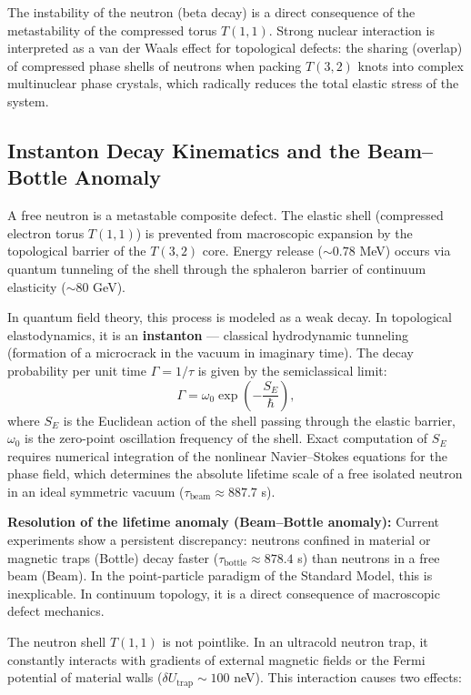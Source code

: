 \documentclass[11pt,a4paper]{article}
\begin{document}
The instability of the neutron (beta decay) is a direct consequence of the metastability of the compressed torus $T(1,1)$. Strong nuclear interaction is interpreted as a van der Waals effect for topological defects: the sharing (overlap) of compressed phase shells of neutrons when packing $T(3,2)$ knots into complex multinuclear phase crystals, which radically reduces the total elastic stress of the system.

\subsection{Instanton Decay Kinematics and the Beam–Bottle Anomaly}
A free neutron is a metastable composite defect. The elastic shell (compressed electron torus $T(1,1)$) is prevented from macroscopic expansion by the topological barrier of the $T(3,2)$ core. Energy release ($\sim 0.78$ MeV) occurs via quantum tunneling of the shell through the sphaleron barrier of continuum elasticity ($\sim 80$ GeV).

In quantum field theory, this process is modeled as a weak decay. In topological elastodynamics, it is an \textbf{instanton} — classical hydrodynamic tunneling (formation of a microcrack in the vacuum in imaginary time). The decay probability per unit time $\Gamma = 1/\tau$ is given by the semiclassical limit:
\begin{equation}
\Gamma = \omega_0 \exp\!\left( -\frac{S_E}{\hbar} \right),
\end{equation}
where $S_E$ is the Euclidean action of the shell passing through the elastic barrier, $\omega_0$ is the zero-point oscillation frequency of the shell. Exact computation of $S_E$ requires numerical integration of the nonlinear Navier–Stokes equations for the phase field, which determines the absolute lifetime scale of a free isolated neutron in an ideal symmetric vacuum ($\tau_{\text{beam}} \approx 887.7$ s).

\textbf{Resolution of the lifetime anomaly (Beam–Bottle anomaly):}
Current experiments show a persistent discrepancy: neutrons confined in material or magnetic traps (Bottle) decay faster ($\tau_{\text{bottle}} \approx 878.4$ s) than neutrons in a free beam (Beam). In the point-particle paradigm of the Standard Model, this is inexplicable. In continuum topology, it is a direct consequence of macroscopic defect mechanics.

The neutron shell $T(1,1)$ is not pointlike. In an ultracold neutron trap, it constantly interacts with gradients of external magnetic fields or the Fermi potential of material walls ($\delta U_{\text{trap}} \sim 100$ neV). This interaction causes two effects:
\end{document}

